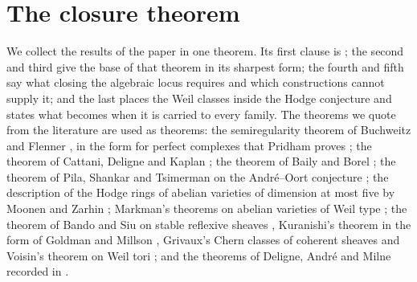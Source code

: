 \section{The closure theorem}\label{sec:final}

We collect the results of the paper in one theorem. Its first clause is
; the second and third give the base of that theorem in its
sharpest form; the fourth and fifth say what closing the algebraic locus
requires and which constructions cannot supply it; and the last places the
Weil classes inside the Hodge conjecture and states what 
becomes when it is carried to every family. The theorems we quote from the
literature are used as theorems: the semiregularity theorem of Buchweitz and
Flenner \cite{BF03}, in the form for perfect complexes that Pridham proves
\cite{Pri24}; the theorem of Cattani, Deligne and Kaplan \cite{CDK95}; the
theorem of Baily and Borel \cite{BB66}; the theorem of Pila, Shankar and
Tsimerman on the Andr\'e--Oort conjecture \cite{PST}; the description of the
Hodge rings of abelian varieties of dimension at most five by Moonen and Zarhin
\cite{MZ99}; Markman's theorems on abelian varieties of Weil type
\cite{Mar25a,Mar25b}; the theorem of Bando and Siu on stable reflexive
sheaves \cite{BS94}, Kuranishi's theorem in the form of Goldman and Millson
\cite{Kur65,GM88}, Grivaux's Chern classes of coherent sheaves \cite{Gri10}
and Voisin's theorem on Weil tori \cite{Voi02b}; and the theorems of Deligne,
Andr\'e and Milne recorded in 
\cite{Del71,And96b,Mil20}.

